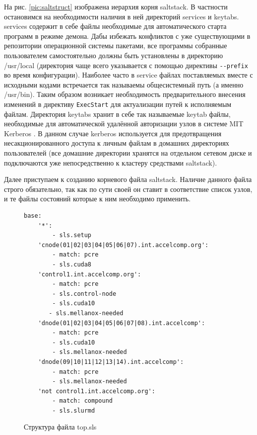 \documentclass[a4paper]{extarticle}
\begin{document}
\newpage

На рис. \ref{pic:saltstruct} изображена иерархия корня saltstack. В частности остановимся на необходимости наличия в ней директорий services и keytabs. services содержит в себе файлы необходимые для автоматического старта программ в режиме демона. Дабы избежать конфликтов с уже существующими в репозитории операционной системы пакетами, все программы собранные пользователем самостоятельно должны быть установлены в директорию /usr/local \cite[стр. 21]{hier} (директория чаще всего указывается с помощью директивы \verb|--prefix| во время конфигурации). Наиболее часто в service файлах поставляемых вместе с исходными кодами встречается так называемы общесистемный путь (а именно /usr/bin). Таким образом возникает необходимость предварительного внесения изменений в директиву \verb|ExecStart| для актуализации путей к исполняемым файлам.
Директория keytabs хранит в себе так называемые keytab файлы, необходимые для автоматической удалённой авторизации узлов в системе MIT Kerberos \cite{mitkerberos}. В данном случае kerberos используется для предотвращения несакционированного доступа к личным файлам в домашних директориях пользователей (все домашние директории хранятся на отдельном сетевом диске и подключаются уже непосредственно к кластеру средствами saltstack). 
 
Далее приступаем к созданию  корневого файла saltstack. Наличие данного файла строго обязательно, так как по сути своей он ставит в соответствие список узлов, и те файлы состояний которые к ним необходимо применить.

\begin{figure}[ht]
\centering
\begin{verbatim}
base:
    '*':
        - sls.setup
    'cnode(01|02|03|04|05|06|07).int.accelcomp.org':
        - match: pcre
        - sls.cuda8
    'control1.int.accelcomp.org':
        - match: pcre
        - sls.control-node
        - sls.cuda10
       - sls.mellanox-needed
    'dnode(01|02|03|04|05|06|07|08).int.accelcomp':
        - match: pcre
        - sls.cuda10
        - sls.mellanox-needed
    'dnode(09|10|11|12|13|14).int.accelcomp':
        - match: pcre
        - sls.mellanox-needed
    'not control1.int.accelcomp.org':
        - match: compound
        - sls.slurmd
\end{verbatim}
\captionsetup{labelfont=bf, labelsep=space}
\caption{Структура файла top.sls}
\label{fig:topsls}
\end{figure}
\end{document}
